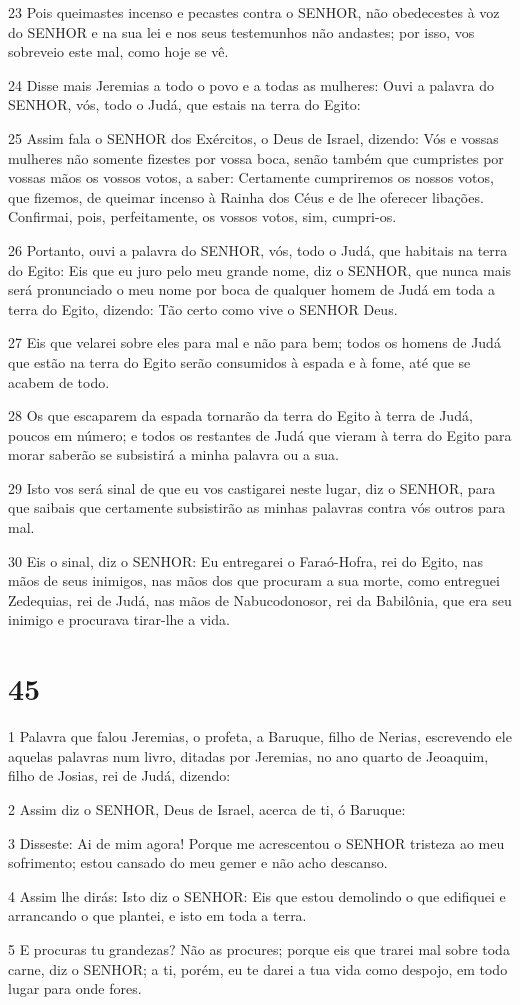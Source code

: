 \par 23 Pois queimastes incenso e pecastes contra o SENHOR, não obedecestes à voz do SENHOR e na sua lei e nos seus testemunhos não andastes; por isso, vos sobreveio este mal, como hoje se vê.
\par 24 Disse mais Jeremias a todo o povo e a todas as mulheres: Ouvi a palavra do SENHOR, vós, todo o Judá, que estais na terra do Egito:
\par 25 Assim fala o SENHOR dos Exércitos, o Deus de Israel, dizendo: Vós e vossas mulheres não somente fizestes por vossa boca, senão também que cumpristes por vossas mãos os vossos votos, a saber: Certamente cumpriremos os nossos votos, que fizemos, de queimar incenso à Rainha dos Céus e de lhe oferecer libações. Confirmai, pois, perfeitamente, os vossos votos, sim, cumpri-os.
\par 26 Portanto, ouvi a palavra do SENHOR, vós, todo o Judá, que habitais na terra do Egito: Eis que eu juro pelo meu grande nome, diz o SENHOR, que nunca mais será pronunciado o meu nome por boca de qualquer homem de Judá em toda a terra do Egito, dizendo: Tão certo como vive o SENHOR Deus.
\par 27 Eis que velarei sobre eles para mal e não para bem; todos os homens de Judá que estão na terra do Egito serão consumidos à espada e à fome, até que se acabem de todo.
\par 28 Os que escaparem da espada tornarão da terra do Egito à terra de Judá, poucos em número; e todos os restantes de Judá que vieram à terra do Egito para morar saberão se subsistirá a minha palavra ou a sua.
\par 29 Isto vos será sinal de que eu vos castigarei neste lugar, diz o SENHOR, para que saibais que certamente subsistirão as minhas palavras contra vós outros para mal.
\par 30 Eis o sinal, diz o SENHOR: Eu entregarei o Faraó-Hofra, rei do Egito, nas mãos de seus inimigos, nas mãos dos que procuram a sua morte, como entreguei Zedequias, rei de Judá, nas mãos de Nabucodonosor, rei da Babilônia, que era seu inimigo e procurava tirar-lhe a vida.

\chapter{45}

\par 1 Palavra que falou Jeremias, o profeta, a Baruque, filho de Nerias, escrevendo ele aquelas palavras num livro, ditadas por Jeremias, no ano quarto de Jeoaquim, filho de Josias, rei de Judá, dizendo:
\par 2 Assim diz o SENHOR, Deus de Israel, acerca de ti, ó Baruque:
\par 3 Disseste: Ai de mim agora! Porque me acrescentou o SENHOR tristeza ao meu sofrimento; estou cansado do meu gemer e não acho descanso.
\par 4 Assim lhe dirás: Isto diz o SENHOR: Eis que estou demolindo o que edifiquei e arrancando o que plantei, e isto em toda a terra.
\par 5 E procuras tu grandezas? Não as procures; porque eis que trarei mal sobre toda carne, diz o SENHOR; a ti, porém, eu te darei a tua vida como despojo, em todo lugar para onde fores.

